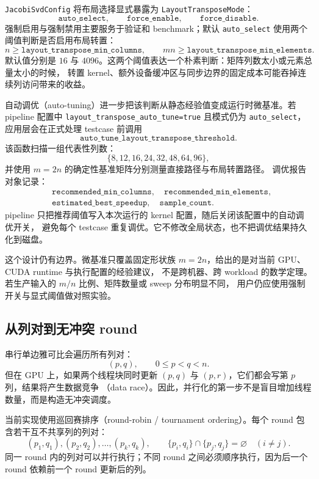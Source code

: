 \texttt{JacobiSvdConfig} 将布局选择显式暴露为 \texttt{LayoutTransposeMode}：
\[
    \texttt{auto\_select},\qquad
    \texttt{force\_enable},\qquad
    \texttt{force\_disable}.
\]
强制启用与强制禁用主要服务于验证和 benchmark；默认 \texttt{auto\_select} 使用两个阈值判断是否启用布局转置：
\[
    n \ge \texttt{layout\_transpose\_min\_columns},
    \qquad
    mn \ge \texttt{layout\_transpose\_min\_elements}.
\]
默认值分别是 \(16\) 与 \(4096\)。这两个阈值表达一个朴素判断：矩阵列数太小或元素总量太小的时候，
转置 kernel、额外设备缓冲区与同步边界的固定成本可能吞掉连续列访问带来的收益。

自动调优（auto-tuning）进一步把该判断从静态经验值变成运行时微基准。若 pipeline 配置中
\texttt{layout\_transpose\_auto\_tune=true} 且模式仍为 \texttt{auto\_select}，
应用层会在正式处理 testcase 前调用
\[
    \texttt{auto\_tune\_layout\_transpose\_threshold}.
\]
该函数扫描一组代表性列数：
\[
    \{8,12,16,24,32,48,64,96\},
\]
并使用 \(m=2n\) 的确定性基准矩阵分别测量直接路径与布局转置路径。
调优报告对象记录：
\[
    \begin{aligned}
         & \texttt{recommended\_min\_columns},\quad
        \texttt{recommended\_min\_elements},        \\
         & \texttt{estimated\_best\_speedup},\quad
        \texttt{sample\_count}.
    \end{aligned}
\]
pipeline 只把推荐阈值写入本次运行的 kernel 配置，随后关闭该配置中的自动调优开关，
避免每个 testcase 重复调优。它不修改全局状态，也不把调优结果持久化到磁盘。

这个设计仍有边界。微基准只覆盖固定形状族 \(m=2n\)，给出的是对当前 GPU、CUDA runtime 与执行配置的经验建议，
不是跨机器、跨 workload 的数学定理。若生产输入的 \(m/n\) 比例、矩阵数量或 sweep 分布明显不同，
用户仍应使用强制开关与显式阈值做对照实验。

\subsection{从列对到无冲突 round}

串行单边雅可比会遍历所有列对：
\[
    (p,q),\qquad 0\le p<q<n.
\]
但在 GPU 上，如果两个线程块同时更新 \((p,q)\) 与 \((p,r)\)，它们都会写第 \(p\) 列，结果将产生数据竞争
（data race）。因此，并行化的第一步不是盲目增加线程数量，而是构造无冲突调度。

当前实现使用巡回赛排序（round-robin / tournament ordering）。每个 round 包含若干互不共享列的列对：
\[
    (p_1,q_1),(p_2,q_2),\ldots,(p_k,q_k),
    \qquad
    \{p_i,q_i\}\cap\{p_j,q_j\}=\varnothing\quad(i\ne j).
\]
同一 round 内的列对可以并行执行；不同 round 之间必须顺序执行，因为后一个 round 依赖前一个 round 更新后的列。

